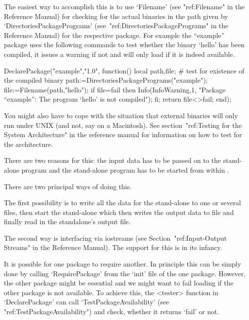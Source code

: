 The easiest way to accomplish this is to use `Filename' (see "ref:Filename"
in the Reference Manual) for checking for  the actual binaries in the path
given by `DirectoriesPackagePrograms' (see~"ref:DirectoriesPackagePrograms"
in the Reference Manual) for the respective package. For example
the ``example'' {\GAP} package uses the following commands to test whether
the binary `hello' has been compiled, it issues a warning if not and will
only load if it is indeed available.

\begintt
DeclarePackage("example","1.0",
  function()
  local path,file;
    # test for existence of the compiled binary
    path:=DirectoriesPackagePrograms("example");
    file:=Filename(path,"hello");
    if file=fail then
      Info(InfoWarning,1,
        "Package ``example'': The program `hello' is not compiled");
    fi;
    return file<>fail;
  end);
\endtt

You might also have to cope with the situation that external binaries will
only run under UNIX (and not, say on a Macintosh). See section~"ref:Testing
for the System Architecture" in the reference manual for information on how
to test for the architecture.


There are two reasons for this: the input data has  to be passed on to
the stand-alone program and the  stand-alone program  has to be  started
from within {\GAP}.

There are two principal ways of doing this.  

The first possibility is to write  all the data  for the stand-alone to
one or several files, then start the stand-alone  which then writes the
output data to file and finally read in the standalone's output file.

The second way is interfacing via iostreams (see 
Section~"ref:Input-Output Streams" in the Reference Manual).
The support for this is in its infancy.


It is possible for one {\GAP} package to require another. In principle this
can be simply done by calling `RequirePackage' from the `init' file of the
one package. However, the other package might be essential and we
might want to fail loading if the other package is not available. To achieve
this,  the <tester> function in `DeclarePackage' can call
`TestPackageAvailability'  (see "ref:TestPackageAvailability") and check,
whether it returns `fail' or not.

